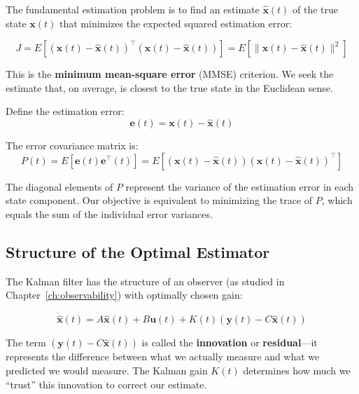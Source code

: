 The fundamental estimation problem is to find an estimate $\hat{\mathbf{x}}(t)$ of the true state $\mathbf{x}(t)$ that minimizes the expected squared estimation error:

\begin{equation}
J = E\left[(\mathbf{x}(t) - \hat{\mathbf{x}}(t))^\top (\mathbf{x}(t) - \hat{\mathbf{x}}(t))\right] = E\left[\|\mathbf{x}(t) - \hat{\mathbf{x}}(t)\|^2\right]
\end{equation}

This is the \textbf{minimum mean-square error} (MMSE) criterion. We seek the estimate that, on average, is closest to the true state in the Euclidean sense.

Define the estimation error:
\begin{equation}
\mathbf{e}(t) = \mathbf{x}(t) - \hat{\mathbf{x}}(t)
\end{equation}

The error covariance matrix is:
\begin{equation}
P(t) = E[\mathbf{e}(t)\mathbf{e}^\top(t)] = E[(\mathbf{x}(t) - \hat{\mathbf{x}}(t))(\mathbf{x}(t) - \hat{\mathbf{x}}(t))^\top]
\end{equation}

The diagonal elements of $P$ represent the variance of the estimation error in each state component. Our objective is equivalent to minimizing the trace of $P$, which equals the sum of the individual error variances.

\subsection{Structure of the Optimal Estimator}

The Kalman filter has the structure of an observer (as studied in Chapter~\ref{ch:observability}) with optimally chosen gain:

\begin{equation}
\boxed{
\dot{\hat{\mathbf{x}}}(t) = A\hat{\mathbf{x}}(t) + B\mathbf{u}(t) + K(t)\left(\mathbf{y}(t) - C\hat{\mathbf{x}}(t)\right)
}
\label{eq:kalman_filter_continuous}
\end{equation}

The term $(\mathbf{y}(t) - C\hat{\mathbf{x}}(t))$ is called the \textbf{innovation} or \textbf{residual}---it represents the difference between what we actually measure and what we predicted we would measure. The Kalman gain $K(t)$ determines how much we ``trust'' this innovation to correct our estimate.


